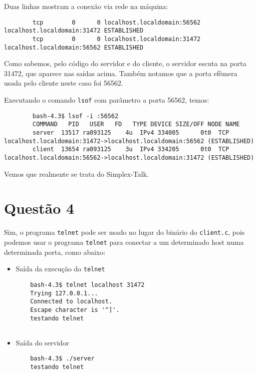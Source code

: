 \documentclass[a4paper,10pt]{article}
\begin{document}
    Duas linhas mostram a conexão via rede na máquina:
    
    \begin{lstlisting}
        tcp        0      0 localhost.localdomain:56562 localhost.localdomain:31472 ESTABLISHED
        tcp        0      0 localhost.localdomain:31472 localhost.localdomain:56562 ESTABLISHED
    \end{lstlisting}
    
    Como sabemos, pelo código do servidor e do cliente, o servidor escuta na porta 31472, que aparece nas saídas acima. Também notamos que a porta efêmera usada pelo cliente neste caso foi 56562.
    
    Executando o comando {\tt lsof} com parâmetro a porta 56562, temos:
    
    \begin{lstlisting}
        bash-4.3$ lsof -i :56562
        COMMAND   PID   USER   FD   TYPE DEVICE SIZE/OFF NODE NAME
        server  13517 ra093125    4u  IPv4 334005      0t0  TCP localhost.localdomain:31472->localhost.localdomain:56562 (ESTABLISHED)
        client  13654 ra093125    3u  IPv4 334205      0t0  TCP localhost.localdomain:56562->localhost.localdomain:31472 (ESTABLISHED)
    \end{lstlisting}
    
    Vemos que realmente se trata do Simplex-Talk.
    

\section{Questão 4}
    Sim, o programa {\tt telnet} pode ser usado no lugar do binário do {\tt client.c}, pois podemos usar o programa {\tt telnet} para conectar a um determinado host numa determinada porta, como abaixo:
    
    \begin{itemize}
        \item Saída da execução do {\tt telnet}
            \begin{lstlisting}
    bash-4.3$ telnet localhost 31472
    Trying 127.0.0.1...
    Connected to localhost.
    Escape character is '^]'.
    testando telnet
        
            \end{lstlisting}
    
        \item Saída do servidor
            \begin{lstlisting}
    bash-4.3$ ./server 
    testando telnet
    
            \end{lstlisting}
    \end{itemize}
\end{document}
